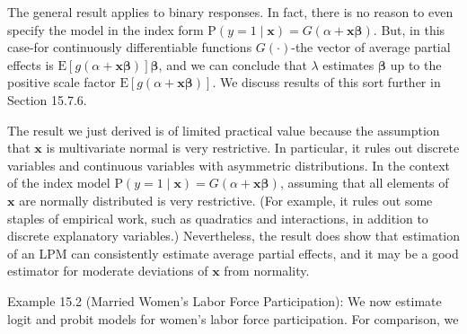 \documentclass[10pt]{article}
\begin{document}
The general result applies to binary responses. In fact, there is no reason to even specify the model in the index form $\mathrm{P}(y=1 \mid \mathbf{x})=G(\alpha+\mathbf{x} \boldsymbol{\beta})$. But, in this case-for continuously differentiable functions $G(\cdot)$-the vector of average partial effects is $\mathrm{E}[g(\alpha+\mathbf{x} \boldsymbol{\beta})] \boldsymbol{\beta}$, and we can conclude that $\lambda$ estimates $\boldsymbol{\beta}$ up to the positive scale factor $\mathrm{E}[g(\alpha+\mathbf{x} \boldsymbol{\beta})]$. We discuss results of this sort further in Section 15.7.6.

The result we just derived is of limited practical value because the assumption that $\mathbf{x}$ is multivariate normal is very restrictive. In particular, it rules out discrete variables and continuous variables with asymmetric distributions. In the context of the index model $\mathrm{P}(y=1 \mid \mathbf{x})=G(\alpha+\mathbf{x} \boldsymbol{\beta})$, assuming that all elements of $\mathbf{x}$ are normally distributed is very restrictive. (For example, it rules out some staples of empirical work, such as quadratics and interactions, in addition to discrete explanatory variables.) Nevertheless, the result does show that estimation of an LPM can consistently estimate average partial effects, and it may be a good estimator for moderate deviations of $\mathbf{x}$ from normality.

Example 15.2 (Married Women's Labor Force Participation): We now estimate logit and probit models for women's labor force participation. For comparison, we
\end{document}
